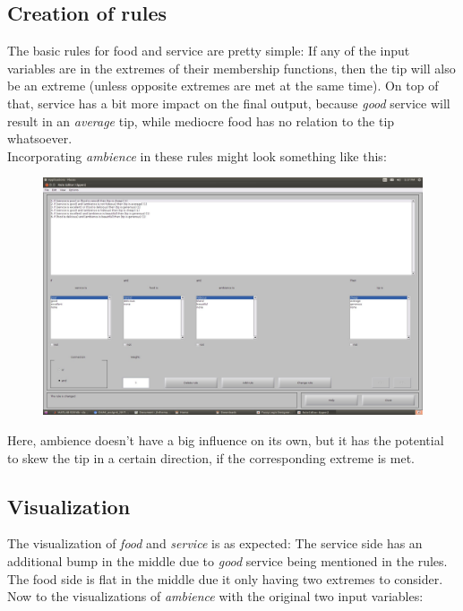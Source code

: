 \documentclass[a4paper, 11pt]{article}
\begin{document}
\newpage
\subsection{Creation of rules}
The basic rules for food and service are pretty simple: If any of the input variables are in the extremes of their membership functions, then the tip will also be an extreme (unless opposite extremes are met at the same time). On top of that, service has a bit more impact on the final output, because \textit{good} service will result in an \textit{average} tip, while mediocre food has no relation to the tip whatsoever.\\
Incorporating \textit{ambience} in these rules might look something like this:

\begin{figure}[ht]
\includegraphics[scale=0.2]{ambience-rules.jpg}
\end{figure}

Here, ambience doesn't have a big influence on its own, but it has the potential to skew the tip in a certain direction, if the corresponding extreme is met.

\newpage
\subsection{Visualization}
The visualization of \textit{food} and \textit{service} is as expected: The service side has an additional bump in the middle due to \textit{good} service being mentioned in the rules. The food side is flat in the middle due it only having two extremes to consider.\\
Now to the visualizations of \textit{ambience} with the original two input variables:
\end{document}
